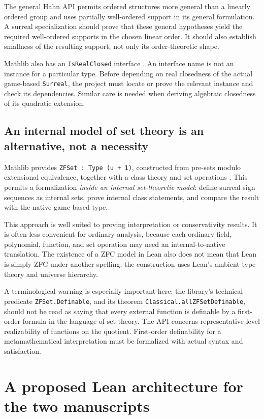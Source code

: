 \documentclass[11pt,letterpaper]{article}
\numberwithin{equation}{section}
\theoremstyle{definition}
\theoremstyle{remark}
\begin{document}
The general Hahn API permits ordered structures more general than a linearly ordered group and uses partially well-ordered support in its general formulation. A surreal specialization should prove that these general hypotheses yield the required well-ordered supports in the chosen linear order. It should also establish smallness of the resulting support, not only its order-theoretic shape.

Mathlib also has an \texttt{IsRealClosed} interface \cite{MathlibRealClosed}. An interface name is not an instance for a particular type. Before depending on real closedness of the actual game-based \texttt{Surreal}, the project must locate or prove the relevant instance and check its dependencies. Similar care is needed when deriving algebraic closedness of its quadratic extension.

\subsection{An internal model of set theory is an alternative, not a necessity}
Mathlib provides \texttt{ZFSet : Type (u + 1)}, constructed from pre-sets modulo extensional equivalence, together with a class theory and set operations \cite{MathlibZFC}. This permits a formalization \emph{inside an internal set-theoretic model}: define surreal sign sequences as internal sets, prove internal class statements, and compare the result with the native game-based type.

This approach is well suited to proving interpretation or conservativity results. It is often less convenient for ordinary analysis, because each ordinary field, polynomial, function, and set operation may need an internal-to-native translation. The existence of a ZFC model in Lean also does not mean that Lean is simply ZFC under another spelling; the construction uses Lean's ambient type theory and universe hierarchy.

A terminological warning is especially important here: the library's technical predicate \texttt{ZFSet.Definable}, and its theorem \texttt{Classical.allZFSetDefinable}, should not be read as saying that every external function is definable by a first-order formula in the language of set theory. The API concerns representative-level realizability of functions on the quotient. First-order definability for a metamathematical interpretation must be formalized with actual syntax and satisfaction.

\section{A proposed Lean architecture for the two manuscripts}\label{sec:architecture}
\end{document}
